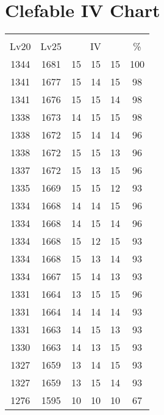 \documentclass{article}%
\begin{document}
%
\normalsize%
\section{Clefable IV Chart}%
\label{sec:Clefable IV Chart}%
\renewcommand{\arraystretch}{1.5}%
\begin{tabular}{|c|c|c|c|c|c|}%
\hline%
\multicolumn{6}{|c|}{\textcolor{white}{ 
\linebreak{Clefable}
}%
\cellcolor{black}}\\%
\multicolumn{1}{|c}{Lv20}&\multicolumn{1}{c|}{Lv25}&\multicolumn{3}{c|}{IV}&\multicolumn{1}{|c|}{\%}\\%
\hline%
\rowcolor{color100}%
1344&1681&15&15&15&100\\%
\hline%
\rowcolor{color98}%
1341&1677&15&14&15&98\\%
\hline%
\rowcolor{color98}%
1341&1676&15&15&14&98\\%
\hline%
\rowcolor{color98}%
1338&1673&14&15&15&98\\%
\hline%
\rowcolor{color96}%
1338&1672&15&14&14&96\\%
\hline%
\rowcolor{color96}%
1338&1672&15&15&13&96\\%
\hline%
\rowcolor{color96}%
1337&1672&15&13&15&96\\%
\hline%
\rowcolor{color93}%
1335&1669&15&15&12&93\\%
\hline%
\rowcolor{color96}%
1334&1668&14&14&15&96\\%
\hline%
\rowcolor{color96}%
1334&1668&14&15&14&96\\%
\hline%
\rowcolor{color93}%
1334&1668&15&12&15&93\\%
\hline%
\rowcolor{color93}%
1334&1668&15&13&14&93\\%
\hline%
\rowcolor{color93}%
1334&1667&15&14&13&93\\%
\hline%
\rowcolor{color96}%
1331&1664&13&15&15&96\\%
\hline%
\rowcolor{color93}%
1331&1664&14&14&14&93\\%
\hline%
\rowcolor{color93}%
1331&1663&14&15&13&93\\%
\hline%
\rowcolor{color93}%
1330&1663&14&13&15&93\\%
\hline%
\rowcolor{color93}%
1327&1659&13&14&15&93\\%
\hline%
\rowcolor{color93}%
1327&1659&13&15&14&93\\%
\hline%
\rowcolor{color91}%
1276&1595&10&10&10&67\\%
\end{tabular}

%
\end{document}
